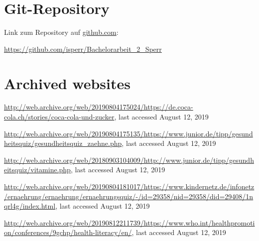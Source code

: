 \begin{appendices}


\section{Git-Repository}

Link zum Repository auf {\url{github.com}}:

\url{https://github.com/isperr/Bachelorarbeit_2_Sperr}


\section{Archived websites}
\sloppy
\url{http://web.archive.org/web/20190804175024/https://de.coca-cola.ch/stories/coca-cola-und-zucker}, last accessed August 12, 2019

\url{http://web.archive.org/web/20190804175135/https://www.junior.de/tipp/gesundheitsquiz/gesundheitsquiz_zaehne.php}, last accessed August 12, 2019
 
\url{http://web.archive.org/web/20180903104009/http://www.junior.de/tipp/gesundheitsquiz/vitamine.php}, last accessed August 12, 2019

\url{http://web.archive.org/web/20190804181017/https://www.kindernetz.de/infonetz/ernaehrung/ernaehrung/ernaehrungsquiz/-/id=29358/nid=29358/did=29408/1nqrl4g/index.html}, last accessed August 12, 2019

\url{http://web.archive.org/web/20190812211739/https://www.who.int/healthpromotion/conferences/9gchp/health-literacy/en/}, last accessed August 12, 2019

\end{appendices}
